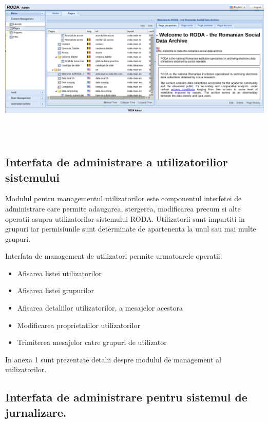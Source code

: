 \documentclass[a4paper, 10pt]{article}
\begin{document}
{\begin{center}
\includegraphics[width=16.1cm,height=8.1cm]{cmspages.png}
\end{center}

\subsection*{Interfata de administrare a utilizatorilior sistemului}

Modulul pentru managementul utilizatorilor este componentul interfetei de administrare care permite adaugarea, stergerea, modificarea precum si alte operatii asupra utilizatorilor sistemului RODA. Utilizatorii sunt impartiti in grupuri iar permisiunile sunt determinate de apartenenta la unul sau mai multe grupuri. 


Interfata de management de utilizatori permite urmatoarele operatii:

\begin{itemize}
\item
Afisarea listei utilizatorilor
\item
Afisarea listei grupurilor
\item
Afisarea detaliilor utilizatorilor, a mesajelor acestora
\item
Modificarea proprietatilor utilizatorilor
\item
Trimiterea mesajelor catre grupuri de utilizator

\end{itemize}


\bigskip

In anexa 1 sunt prezentate detalii despre modulul de management al utilizatorilor.



\subsection*{Interfata de administrare pentru sistemul de jurnalizare.}


}
\end{document}
